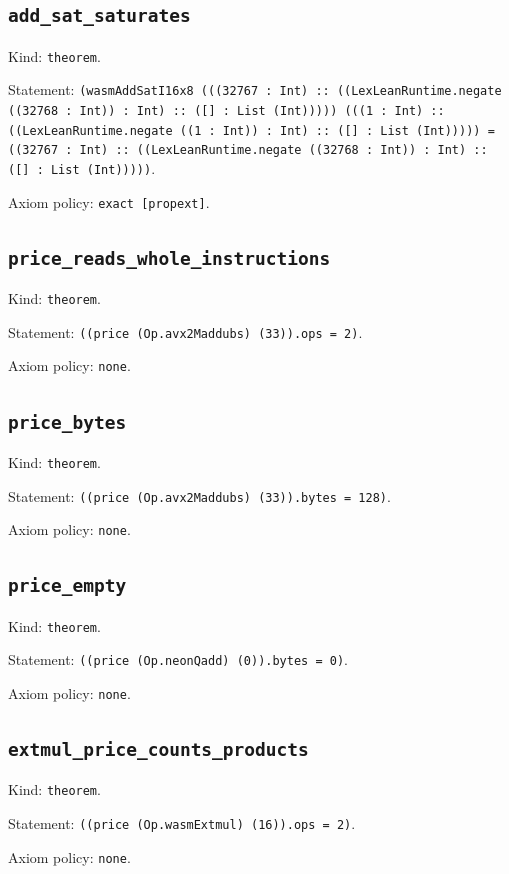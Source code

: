 \documentclass[11pt]{article}
\begin{document}
\subsection*{\texttt{add\_sat\_saturates}}
\noindent Kind: \texttt{theorem}.\par
\noindent Statement: \texttt{(wasmAddSatI16x8 (((32767 : Int) :: ((LexLeanRuntime.negate ((32768 : Int)) : Int) :: ([] : List (Int))))) (((1 : Int) :: ((LexLeanRuntime.negate ((1 : Int)) : Int) :: ([] : List (Int))))) = ((32767 : Int) :: ((LexLeanRuntime.negate ((32768 : Int)) : Int) :: ([] : List (Int)))))}.\par
\noindent Axiom policy: \texttt{exact [propext]}.\par
\subsection*{\texttt{price\_reads\_whole\_instructions}}
\noindent Kind: \texttt{theorem}.\par
\noindent Statement: \texttt{((price (Op.avx2Maddubs) (33)).ops = 2)}.\par
\noindent Axiom policy: \texttt{none}.\par
\subsection*{\texttt{price\_bytes}}
\noindent Kind: \texttt{theorem}.\par
\noindent Statement: \texttt{((price (Op.avx2Maddubs) (33)).bytes = 128)}.\par
\noindent Axiom policy: \texttt{none}.\par
\subsection*{\texttt{price\_empty}}
\noindent Kind: \texttt{theorem}.\par
\noindent Statement: \texttt{((price (Op.neonQadd) (0)).bytes = 0)}.\par
\noindent Axiom policy: \texttt{none}.\par
\subsection*{\texttt{extmul\_price\_counts\_products}}
\noindent Kind: \texttt{theorem}.\par
\noindent Statement: \texttt{((price (Op.wasmExtmul) (16)).ops = 2)}.\par
\noindent Axiom policy: \texttt{none}.\par
\end{document}
